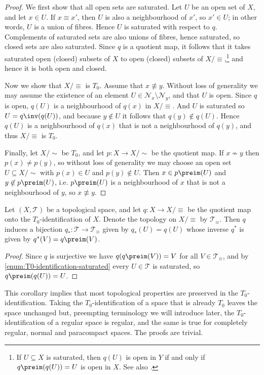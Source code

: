 \documentclass[article, a4paper, 11pt, oneside]{memoir}
\numberwithin{equation}{chapter}
\newcommand{\calT}{\mathcal{T}}
\newcommand{\calN}{\mathcal{N}}
\newcommand{\nhoodfilter}[1]{\calN_{#1}}
\begin{document}
\begin{proof}
    We first show that all open sets are saturated. Let $U$ be an open set of $X$, and let $x \in U$. If $x \equiv x'$, then $U$ is also a neighbourhood of $x'$, so $x' \in U$; in other words, $U$ is a union of fibres. Hence $U$ is saturated with respect to $q$. Complements of saturated sets are also unions of fibres, hence saturated, so closed sets are also saturated. Since $q$ is a quotient map, it follows that it takes saturated open (closed) subsets of $X$ to open (closed) subsets of $X/{\equiv}$,\footnote{If $U \subseteq X$ is saturated, then $q(U)$ is open in $Y$ if and only if $q\preim(q(U)) = U$ is open in $X$. See also \textcite[Proposition~3.60]{leetopological}.} and hence it is both open and closed.

    Now we show that $X/{\equiv}$ is $T_0$. Assume that $x \not\equiv y$. Without loss of generality we may assume the existence of an element $U \in \nhoodfilter{x} \setminus \nhoodfilter{y}$, and that $U$ is open. Since $q$ is open, $q(U)$ is a neighbourhood of $q(x)$ in $X/{\equiv}$. And $U$ is saturated so $U = q\inv(q(U))$, and because $y \not\in U$ it follows that $q(y) \not\in q(U)$. Hence $q(U)$ is a neighbourhood of $q(x)$ that is not a neighbourhood of $q(y)$, and thus $X/{\equiv}$ is $T_0$.

    Finally, let $X/{\sim}$ be $T_0$, and let $p \colon X \to X/{\sim}$ be the quotient map. If $x \not\sim y$ then $p(x) \neq p(y)$, so without loss of generality we may choose an open set $U \subseteq X/{\sim}$ with $p(x) \in U$ and $p(y) \not\in U$. Then $x \in p\preim(U)$ and $y \not\in p\preim(U)$, i.e. $p\preim(U)$ is a neighbourhood of $x$ that is not a neighbourhood of $y$, so $x \not\equiv y$.
\end{proof}


\begin{corollary}
    Let $(X,\calT)$ be a topological space, and let $q \colon X \to X/{\equiv}$ be the quotient map onto the $T_0$-identification of $X$. Denote the topology on $X/{\equiv}$ by $\calT_\equiv$. Then $q$ induces a bijection $q_* \colon \calT \to \calT_\equiv$ given by $q_*(U) = q(U)$ whose inverse $q^*$ is given by $q^*(V) = q\preim(V)$.
\end{corollary}

\begin{proof}
    Since $q$ is surjective we have $q(q\preim(V)) = V$ for all $V \in \calT_\equiv$, and by \cref{enum:T0-identification-saturated} every $U \in \calT$ is saturated, so $q\preim(q(U)) = U$.
\end{proof}
%
This corollary implies that most topological properties are preserved in the $T_0$-identification. Taking the $T_0$-identification of a space that is already $T_0$ leaves the space unchanged but, preempting terminology we will introduce later, the $T_0$-identification of a regular space is regular, and the same is true for completely regular, normal and paracompact spaces. The proofs are trivial.
\end{document}
